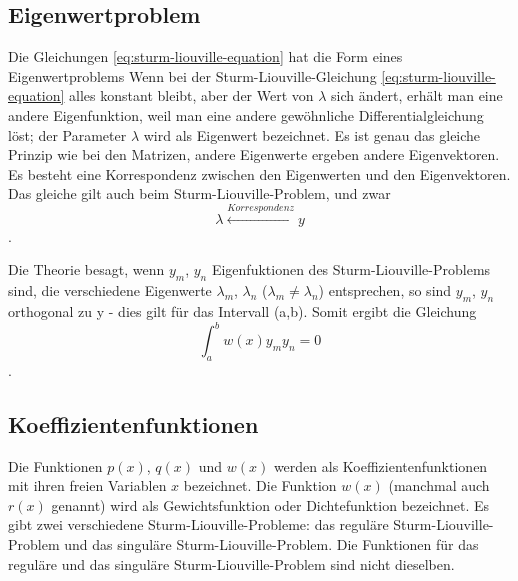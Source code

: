 \subsection{Eigenwertproblem}
Die Gleichungen \ref{eq:sturm-liouville-equation} hat die Form eines Eigenwertproblems
Wenn bei der Sturm-Liouville-Gleichung \ref{eq:sturm-liouville-equation} alles  konstant bleibt, aber der Wert von $\lambda$ sich ändert, erhält man eine andere Eigenfunktion, weil man eine andere gewöhnliche Differentialgleichung löst;
der Parameter $\lambda$ wird als Eigenwert bezeichnet.
Es ist genau das gleiche Prinzip wie bei den Matrizen, andere Eigenwerte ergeben andere Eigenvektoren.
Es besteht eine Korrespondenz zwischen den Eigenwerten und den Eigenvektoren.
Das gleiche gilt auch beim Sturm-Liouville-Problem, und zwar
\begin{equation}
	\lambda \overset{Korrespondenz}\leftrightarrow y
\end{equation}.

Die Theorie besagt, wenn $y_m$, $y_n$ Eigenfuktionen des Sturm-Liouville-Problems sind, die verschiedene Eigenwerte $\lambda_m$, $\lambda_n$ ($\lambda_m \neq \lambda_n$) entsprechen, so sind $y_m$, $y_n$ orthogonal zu y -
dies gilt für das Intervall (a,b).
Somit ergibt die Gleichung
\begin{equation}
	\int_{a}^{b} w(x)y_m y_n = 0
\end{equation}.

\subsection{Koeffizientenfunktionen}
Die Funktionen $p(x)$, $q(x)$ und $w(x)$ werden als Koeffizientenfunktionen mit ihren freien Variablen $x$ bezeichnet.
Die Funktion $w(x)$ (manchmal auch $r(x)$ genannt) wird als Gewichtsfunktion oder Dichtefunktion bezeichnet.
Es gibt zwei verschiedene Sturm-Liouville-Probleme: das reguläre Sturm-Liouville-Problem und das singuläre Sturm-Liouville-Problem. 
Die Funktionen für das reguläre und das singuläre Sturm-Liouville-Problem sind nicht dieselben.

%
%

